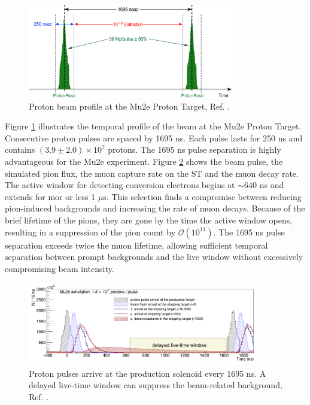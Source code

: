 \begin{figure}[!h]
\centering
\includegraphics[width =0.8\textwidth]{figures/png/Screenshot_20240301_151148.png}
\caption{Proton beam profile at the Mu2e Proton Target, Ref. \cite{accelerator}.}
\label{fig:beamprofile}
\end{figure}
Figure \ref{fig:beamprofile} illustrates the temporal profile of the beam at the Mu2e Proton Target. Consecutive proton pulses are spaced by 1695 ns. Each pulse lasts for 250 ns and contains $(3.9 \pm 2.0 )\times 10^7$ protons. The 1695 ns pulse separation is highly advantageous for the Mu2e experiment. Figure \ref{fig:beamwindow} shows the beam pulse, 
the simulated pion flux, the muon capture rate on the ST and the muon decay rate. The active window for detecting conversion electrons begins at $\sim$640 ns and extends for mor or less 1 $\mu$s. This selection finds a compromise between reducing pion-induced backgrounds  and increasing the rate of muon decays. Because of the brief lifetime of the pions, they are gone by the time the active window opens, resulting in a suppression of the pion count by $\mathcal{O}(10^{11})$. The 1695 ns pulse separation exceeds twice the muon lifetime, allowing sufficient temporal separation between prompt backgrounds and the live window without excessively compromising beam intensity.
\begin{figure}[!h]
\centering
\includegraphics[width =0.9\textwidth]{figures/png/Screenshot_20240301_164649.png}
\caption{Proton pulses arrive at the production solenoid every 1695 ns. A delayed live-time window can suppress the beam-related background, Ref. \cite{universe9010054}.}
\label{fig:beamwindow}
\end{figure}

